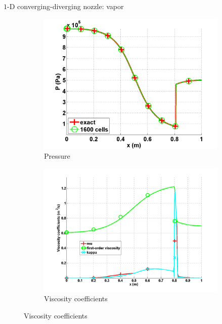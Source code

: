 \documentclass[xcolor=dvipsnames,10pt]{beamer}
\begin{document}
\begin{frame}{$1$-D converging-diverging nozzle: vapor}
\begin{figure}[H]
        \begin{subfigure}[b]{0.37\textwidth}
                \centering
                \includegraphics[width=\textwidth]{../figures/vapor_pressure_numerical_and_exact_1600.png}
                \caption{Pressure}
        \end{subfigure}
        \begin{subfigure}[b]{0.37\textwidth}
                \centering
                \includegraphics[width=\textwidth]{../figures/vapor_viscosity_numerical1600.png}
                \caption{Viscosity coefficients}
        \end{subfigure}
\end{figure}
\end{frame}
\end{document}
